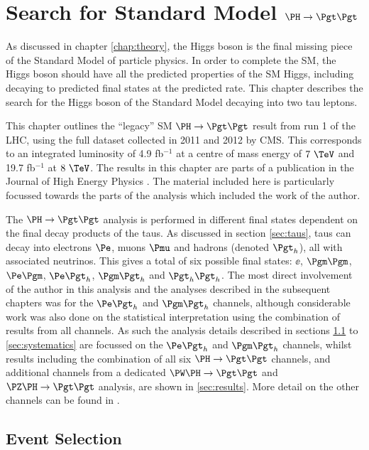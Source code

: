 \chapter{Search for Standard Model $\PH \to \Pgt\Pgt$}
\label{chap:htt-sm}

As discussed in chapter \ref{chap:theory}, the Higgs boson is the final missing 
piece of the Standard Model of particle physics. In order to complete the
\ac{SM}, the Higgs boson should have all the predicted properties of the
\ac{SM} Higgs, including decaying to predicted final states at the predicted rate. This
chapter describes the search for the Higgs boson of the Standard Model 
decaying into two tau leptons.

This chapter outlines the ``legacy'' \ac{SM} $\HToTauTau$ result from run 1 of the \ac{LHC}, using the
full dataset collected in 2011 and 2012 by CMS. This corresponds to an
integrated luminosity of 4.9 fb$^{-1}$ at a centre of mass energy of $7~\TeV$ and
19.7 fb$^{-1}$ at $8~\TeV$. The results in this chapter are parts of a publication 
in the Journal of High Energy Physics \cite{HIG-13-004}. The material included 
here is particularly focussed towards the parts of the analysis which 
included the work of the author. 

The $\PH \to \Pgt\Pgt$ analysis is performed in different final states dependent
on the final decay products of the taus. As discussed in section
\ref{sec:taus}, taus can decay into electrons $\Pe$,
muons $\Pmu$ and hadrons (denoted $\Pgth$), all with associated neutrinos.
This gives a total of six possible final states: $\ee$, $\mumu$, $\emu$,
$\etau$, $\mutau$ and $\tautau$. The most direct involvement of the author in this
analysis and the analyses described in the subsequent chapters was for the $\etau$ and
$\mutau$ channels, although considerable work was also done on the statistical
interpretation using the combination of results from all channels. 
As such the analysis details described in sections \ref{sec:eventSelection} to 
\ref{sec:systematics} are focussed on the
$\etau$ and $\mutau$ channels, whilst results including the combination of all
six $\HToTauTau$ channels, and additional channels from a dedicated $\PW\PH\to\Pgt\Pgt$ and
$\PZ\PH\to\Pgt\Pgt$ analysis, are shown in \ref{sec:results}. More detail on the other channels
can be found in \cite{HIG-13-004}. 

\section{Event Selection}
\label{sec:eventSelection}

